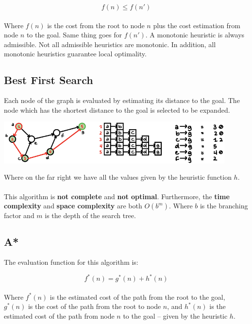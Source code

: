 \documentclass{article}
\begin{document}
\[ f(n) \leq f(n') \] \\
Where $f(n)$ is the cost from the root to node $n$ plus the cost estimation from node $n$ to the goal. Same thing goes for $f(n')$. A monotonic heuristic is always admissible. Not all admissible heuristics are monotonic. In addition, all monotonic heuristics guarantee local optimality.

\subsection{Best First Search}
Each node of the graph is evaluated by estimating its distance to the goal. The node which has the shortest distance to the goal is selected to be expanded.\\

\begin{center}
	\includegraphics[width=12cm]{befs.png}
\end{center}
\vspace{.3cm}
Where on the far right we have all the values given by the heuristic function $h$. \\ \\
This algorithm is \textbf{not complete} and \textbf{not optimal}. Furthermore, the \textbf{time complexity} and \textbf{space complexity} are both $O(b^m)$. Where $b$ is the branching factor and $m$ is the depth of the search tree.

\subsection{A*}
The evaluation function for this algorithm is:

\[ f^*(n) = g^*(n) + h^*(n) \] \\
Where $f^*(n)$ is the estimated cost of the path from the root to the goal, $g^*(n)$ is the cost of the path from the root to node $n$, and $h^*(n)$ is the estimated cost of the path from node $n$ to the goal -- given by the heuristic $h$.\\
\end{document}
